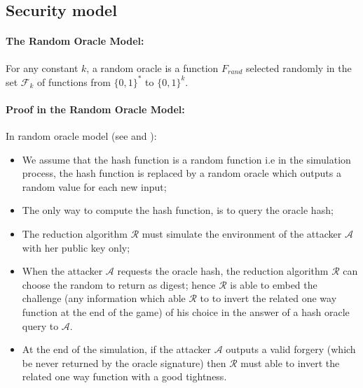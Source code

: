 \documentclass[a4paper,11pt]{article}
\begin{document}
\subsection{Security model}\label{sec:one:1}

\paragraph{The Random Oracle Model:}

For any constant $k$, a random oracle is a function $F_{rand}$ selected randomly in the set $\mathcal{F}_{k}$ of functions from $\{0,1\}^{*}$ to $\{0,1\}^{k}$.

\vspace{0.2cm}

\paragraph{Proof in the Random Oracle Model:}

In random oracle model (see \cite{Bellare1} and \cite{Canetti}):
\begin{itemize}
\item We assume that the hash function is a random function i.e in the simulation process, the hash function is replaced by a random oracle which outputs a random value for each new input;
\item The only way to compute the hash function, is to query the oracle hash;
\item The reduction algorithm $\mathcal{R}$ must simulate the  environment of the attacker $\mathcal{A}$ with her public key only;
\item  When the attacker $\mathcal{A}$ requests the oracle hash,
 the reduction algorithm $\mathcal{R}$ can choose the random to return as digest; hence $\mathcal{R}$
is able to embed the challenge (any information which able $\mathcal{R}$ to to invert the related one way function at the end of the game) of his choice in the answer of a hash  oracle query to $\mathcal{A}$.
\item  At the end of the simulation, if the attacker $\mathcal{A}$ outputs a valid
 forgery (which be never returned by the oracle signature) then $\mathcal{R}$
 must able to invert the related one way function with a good tightness.
\end{itemize}
\end{document}
